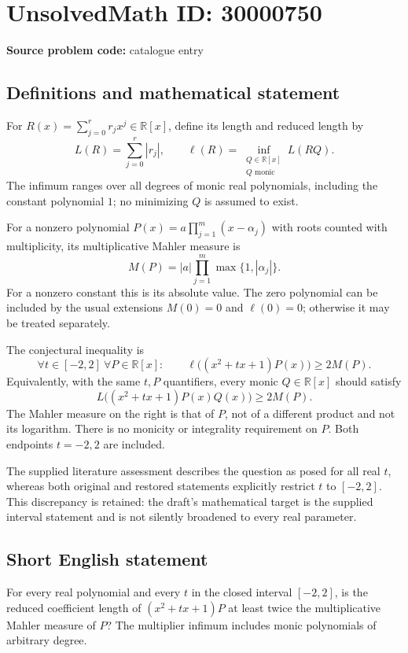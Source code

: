 \documentclass[11pt]{article}
\newcommand{\Q}{\mathbb{Q}}
\newcommand{\R}{\mathbb{R}}
\begin{document}
\section*{UnsolvedMath ID: 30000750}
\textbf{Source problem code:} catalogue entry
\subsection{Definitions and mathematical statement}
For $R(x)=\sum_{j=0}^r r_jx^j\in\R[x]$, define its length and reduced length by
\[
 L(R)=\sum_{j=0}^r|r_j|,\qquad
 \ell(R)=\inf_{\substack{Q\in\R[x]\\Q\text{ monic}}}L(RQ).
\]
The infimum ranges over all degrees of monic real polynomials, including the constant polynomial $1$; no minimizing $Q$ is assumed to exist.

For a nonzero polynomial $P(x)=a\prod_{j=1}^m(x-\alpha_j)$ with roots counted with multiplicity, its multiplicative Mahler measure is
\[
 M(P)=|a|\prod_{j=1}^m\max\{1,|\alpha_j|\}.
\]
For a nonzero constant this is its absolute value. The zero polynomial can be included by the usual extensions $M(0)=0$ and $\ell(0)=0$; otherwise it may be treated separately.

The conjectural inequality is
\[
 \forall t\in[-2,2]\ \forall P\in\R[x]:\qquad
 \ell\bigl((x^2+tx+1)P(x)\bigr)\ge2M(P).
\]
Equivalently, with the same $t,P$ quantifiers, every monic $Q\in\R[x]$ should satisfy
\[
 L\bigl((x^2+tx+1)P(x)Q(x)\bigr)\ge2M(P).
\]
The Mahler measure on the right is that of $P$, not of a different product and not its logarithm. There is no monicity or integrality requirement on $P$. Both endpoints $t=-2,2$ are included.

The supplied literature assessment describes the question as posed for all real $t$, whereas both original and restored statements explicitly restrict $t$ to $[-2,2]$. This discrepancy is retained: the draft's mathematical target is the supplied interval statement and is not silently broadened to every real parameter.
\subsection{Short English statement}
For every real polynomial and every $t$ in the closed interval $[-2,2]$, is the reduced coefficient length of $(x^2+tx+1)P$ at least twice the multiplicative Mahler measure of $P$? The multiplier infimum includes monic polynomials of arbitrary degree.
\end{document}
